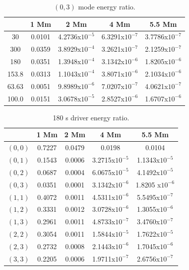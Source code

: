 \documentclass[authoryear,final,1p]{elsarticle}
\begin{document}
\begin{table}
\centering
\begin{tabular}{c c c c c }
\hline
   &  1 Mm & 2 Mm & 4 Mm & 5.5 Mm \\
\hline
30 &  0.0101 &  4.2736x$10^{-5}$ & 6.3291x$10^{-7}$ & 3.7786x$10^{-7}$\\
\hline
300 & 0.0359 & 3.8929x$10^{-4}$ & 3.2621x$10^{-7}$ & 2.1259x$10^{-7}$\\
\hline
180 & 0.0351 &1.3948x$10^{-4}$ & 3.1342x$10^{-6}$ & 1.8205x$10^{-6}$\\
\hline
153.8 & 0.0313 & 1.1043x$10^{-4}$ & 3.8071x$10^{-6}$ & 2.1034x$10^{-6}$\\
\hline
63.63 & 0.0051 & 9.8989x$10^{-6}$ & 7.0207x$10^{-7}$ & 4.0621x$10^{-7}$\\
\hline
100.0 & 0.0151 & 3.0678x$10^{-5}$ & 2.8527x$10^{-6}$ & 1.6707x$10^{-6}$\\
\hline
\end{tabular} 
\caption{$(0, 3)$ mode energy ratio.}
\end{table}

\begin{table}
\centering
\begin{tabular}{c c c c c }
\hline
   &  1 Mm & 2 Mm & 4 Mm & 5.5 Mm \\
\hline
$(0, 0)$ &  0.7227 & 0.0479 & 0.0198 & 0.0104 \\
\hline
$(0, 1)$ & 0.1543 & 0.0006 & 3.2715x$10^{-5}$ &  1.1343x$10^{-5}$\\
\hline
$(0, 2)$ & 0.0687 & 0.0004 & 6.0675x$10^{-5}$ &  4.1492x$10^{-5}$\\
\hline
$(0, 3)$ & 0.0351 & 0.0001 & 3.1342x$10^{-6}$ & 1.8205 x$10^{-6}$\\
\hline
$(1, 1)$ & 0.4072 & 0.0011 & 4.5311x$10^{-6}$ &  5.5495x$10^{-7}$\\
\hline
$(1, 2)$ & 0.3331 & 0.0012 & 3.0728x$10^{-6}$ &  1.3055x$10^{-6}$\\
\hline
$(1, 3)$ & 0.2961 & 0.0011 & 4.8733x$10^{-7}$ &  3.4760x$10^{-7}$\\
\hline
$(2, 2)$ & 0.3054 & 0.0011 & 1.5844x$10^{-5}$ &  1.7622x$10^{-5}$\\
\hline
$(2, 3)$ & 0.2732 & 0.0008 & 2.1443x$10^{-6}$ &  1.7045x$10^{-6}$\\
\hline
$(3, 3)$ & 0.2205 & 0.0006 & 1.9711x$10^{-7}$ &  2.6756x$10^{-7}$\\
\hline
\end{tabular} 
\caption{180 s driver energy ratio.}
\end{table}
\end{document}
